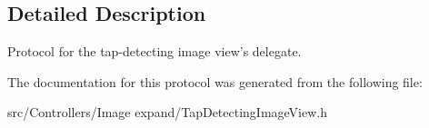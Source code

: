 \subsection{\-Detailed \-Description}
\-Protocol for the tap-\/detecting image view's delegate. 

\-The documentation for this protocol was generated from the following file\-:\begin{DoxyCompactItemize}
\item 
src/\-Controllers/\-Image expand/\-Tap\-Detecting\-Image\-View.\-h\end{DoxyCompactItemize}
